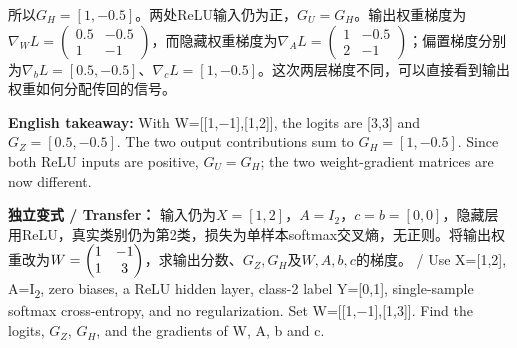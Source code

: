 所以\(G_H=[1,-0.5]\)。两处ReLU输入仍为正，\(G_U=G_H\)。输出权重梯度为\(\nabla_WL=\begin{pmatrix}0.5&-0.5\\1&-1\end{pmatrix}\)，而隐藏权重梯度为\(\nabla_AL=\begin{pmatrix}1&-0.5\\2&-1\end{pmatrix}\)；偏置梯度分别为\(\nabla_bL=[0.5,-0.5]\)、\(\nabla_cL=[1,-0.5]\)。这次两层梯度不同，可以直接看到输出权重如何分配传回的信号。


\textbf{English takeaway:} With W=[[1,\ensuremath{-}1],[1,2]], the logits are [3,3] and \(G_Z=[0.5,-0.5]\). The two output contributions sum to \(G_H=[1,-0.5]\). Since both ReLU inputs are positive, \(G_U=G_H\); the two weight-gradient matrices are now different.


\textbf{独立变式 / Transfer：} 输入仍为\(X=[1,2]\)，\(A=I_2\)，\(c=b=[0,0]\)，隐藏层用ReLU，真实类别仍为第2类，损失为单样本softmax交叉熵，无正则。将输出权重改为\(W=\nobreak\begin{pmatrix}1&-1\\1&3\end{pmatrix}\)，求输出分数、\(G_Z,G_H\)及\(W,A,b,c\)的梯度。 / Use X=[1,2], A=I\textsubscript{2}, zero biases, a ReLU hidden layer, class-2 label Y=[0,1], single-sample softmax cross-entropy, and no regularization. Set W=[[1,\ensuremath{-}1],[1,3]]. Find the logits, \(G_Z\), \(G_H\), and the gradients of W, A, b and c.



